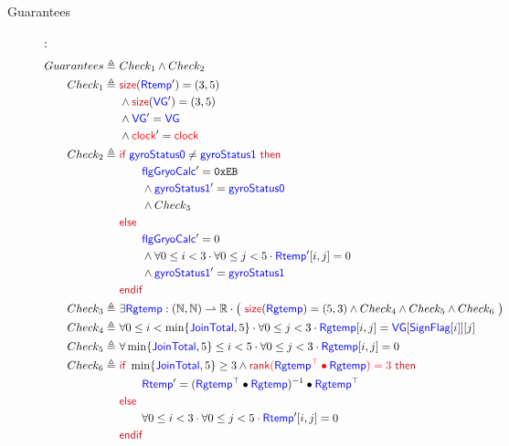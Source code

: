 \documentclass[fleqn,a4paper]{article}
\newcommand\Var[1]{\textcolor{blue}{\textsf{#1}}}
\newcommand\syntax[1]{\textcolor[RGB]{202,12,22}{\textsf{#1}}}
\newcommand\clock{\textcolor{red}{\textsf{clock}}}
\newcommand\definedby{\triangleq}
\begin{document}
\begin{description}
\item[Guarantees]:
\begin{align*}
Guarantees \definedby \
& Check_1 \wedge Check_2 \\
Check_1 \definedby \
& \syntax{size}(\Var{Rtemp}') = (3,5) \\
& \wedge \syntax{size}(\Var{VG}') = (3,5) \\
& \wedge \Var{VG}' = \Var{VG} \\
& \wedge \clock' = \clock \\
Check_2 \definedby \
& \syntax{if }\Var{gyroStatus0}\neq\Var{gyroStatus1}\syntax{ then} \\
& \qquad \Var{flgGryoCalc}' = \texttt{0xEB} \\
& \qquad \wedge \Var{gyroStatus1}' = \Var{gyroStatus0} \\
& \qquad \wedge Check_3 \\
& \syntax{else} \\
& \qquad \Var{flgGryoCalc}' = 0 \\
& \qquad \wedge \forall 0 \leq i < 3 \cdot \forall 0 \leq j < 5 \cdot \Var{Rtemp}'[i,j] = 0 \\
& \qquad \wedge\Var{gyroStatus1}' = \Var{gyroStatus1} \\
& \syntax{endif} \\
Check_3 \definedby \
& \exists \Var{Rgtemp} : (\mathbb{N},\mathbb{N}) \rightharpoonup \mathbb{R} \cdot
\big{(} \
\syntax{size}(\Var{Rgtemp}) = (5,3)
\wedge Check_4 \wedge Check_5 \wedge Check_6 \
\big{)}\\
Check_4 \definedby \
& \forall 0 \leq i < \min\{\Var{JoinTotal},5\} \cdot \forall 0 \leq j < 3 \cdot
  \Var{Rgtemp}[i,j] = \Var{VG}[\Var{SignFlag}[i]][j] \\
Check_5 \definedby \
& \forall \min\{\Var{JoinTotal},5\} \leq i < 5 \cdot \forall 0 \leq j < 3 \cdot \Var{Rgtemp}[i,j] = 0 \\
Check_6 \definedby \
& \syntax{if }
  \min\{\Var{JoinTotal},5\} \geq 3 \wedge \textcolor{red}{\syntax{rank}(\Var{Rgtemp}^\top \bullet \Var{Rgtemp}) = 3}
  \syntax{ then} \\
& \qquad \Var{Rtemp}' = (\Var{Rgtemp}^\top \bullet \Var{Rgtemp})^{-1} \bullet \Var{Rgtemp}^\top \\
& \syntax{else} \\
& \qquad \forall 0 \leq i < 3 \cdot \forall 0 \leq j < 5 \cdot \Var{Rtemp}'[i,j] = 0 \\
& \syntax{endif}
\end{align*}

\end{description}
 
\end{document}
